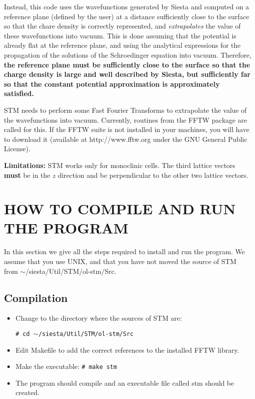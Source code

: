 Instead, this code uses the wavefunctions generated by {\sc Siesta}
and computed on a reference plane (defined by the user)
at a distance sufficiently close to the surface so that the
chare density is correctly represented, and {\em extrapolates}
the value of these wavefunctions into vacuum. This is done assuming
that the potential is already flat at the reference plane,
and using the analytical expressions for the propagation of the
solutions of the Schroedinger equation into vacuum. Therefore, {\bf the
reference plane must be sufficiently close to the surface
so that the charge density is large and well described by {\sc Siesta},
but sufficiently far so that the constant potential approximation
is approximately satisfied.}

{\sc STM} needs to perform some Fast Fourier Transforms to
extrapolate the value of the wavefunctions into vacuum.
Currently, routines from the FFTW package are called for this.
If the FFTW suite is not installed in your machines, you
will have to download it (available at http://www.fftw.org
under the GNU General Public License).

\noindent
{\bf Limitations:} {\sc STM} works only for monoclinic cells.
The third lattice vectors {\bf must} be in the $z$ direction
and be perpendicular to the other two lattice vectors.

\section{HOW TO COMPILE AND RUN THE PROGRAM}

In this section we give all the steps required to install and run the
program.  We assume that you use UNIX, and that you have not moved the
source of {\sc STM} from $\sim$/siesta/Util/STM/ol-stm/Src.

\subsection{Compilation}

  \begin{itemize}

   \item Change to the directory where the sources of {\sc STM} are:

         {\tt \# cd $\sim$/siesta/Util/STM/ol-stm/Src}

   \item Edit Makefile to add the correct references to the installed
   FFTW library.

   \item Make the executable:
         {\tt \# make stm}

   \item The program should compile and an executable file called
         stm should be created.

  \end{itemize}

